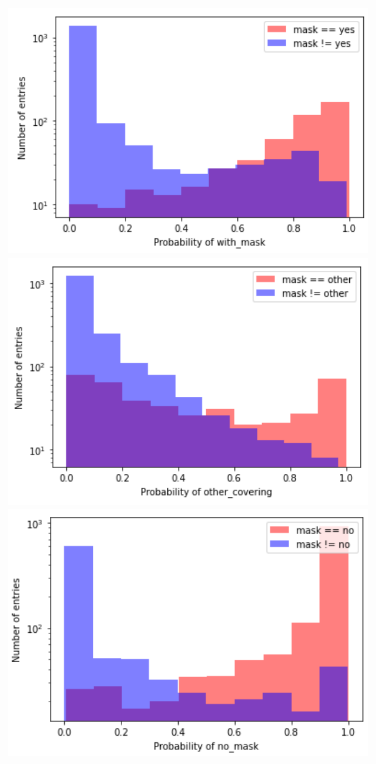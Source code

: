 \documentclass[aspectratio=1610, 9pt]{beamer}
\begin{document}
\begin{frame}
  \begin{figure}
  \begin{minipage}{\textwidth}
    \centering
    \begin{minipage}{0.4\textwidth}
      \includegraphics[width=0.85\textwidth]{images/mask.png}
    \end{minipage}
    \begin{minipage}{0.4\textwidth}
      \includegraphics[width=0.85\textwidth]{images/other.png}
    \end{minipage}
  \end{minipage}
  \begin{minipage}{\textwidth}
    \centering
    \begin{minipage}{0.4\textwidth}
      \includegraphics[width=0.85\textwidth]{images/nomask.png}

\end{minipage}
\end{minipage}
\end{figure}
\end{frame}
\end{document}

